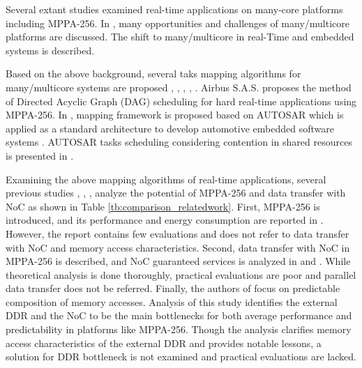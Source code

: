 \documentclass{sig-alternate-05-2015}
\begin{document}
Several extant studies examined real-time applications on many-core platforms including MPPA-256.
In \cite{saidi2015shift}, many opportunities and challenges of many/multicore platforms are discussed.
The shift to many/multicore in real-Time and embedded systems is described. 

Based on the above background, several taks mapping algorithms for many/multicore systems are proposed \cite{perret2016mapping}, \cite{puffitsch2015off}, \cite{carle2014static}, \cite{becker2014mapping}, \cite{faragardi2014communication}.
Airbus S.A.S. \cite{perret2016mapping} proposes the method of Directed Acyclic Graph (DAG) scheduling for hard real-time applications using MPPA-256.
In \cite{faragardi2014communication}, mapping framework is proposed based on AUTOSAR which is applied as a standard architecture to develop automotive embedded software systems \cite{furst2009autosar}.
AUTOSAR tasks scheduling considering contention in shared resources is presented in \cite{becker2016contention}.

Examining the above mapping algorithms of real-time applications, several previous studies \cite{kanter2015kalray}, \cite{denet2017work}, \cite{deDinechin2014GSN}, \cite{perret2016predictable} analyze the potential of MPPA-256 and data transfer with NoC as shown in Table \ref{tb:comparison_relatedwork}.
First, MPPA-256 is introduced, and its performance and energy consumption are reported in \cite{kanter2015kalray}.
However, the report contains few evaluations and does not refer to data transfer with NoC and memory access characteristics.
Second, data transfer with NoC in MPPA-256 is described, and NoC guaranteed services is analyzed in \cite{denet2017work} and \cite{deDinechin2014GSN}.
While theoretical analysis is done thoroughly, practical evaluations are poor and parallel data transfer does not be referred.
Finally, the authors of \cite{perret2016predictable} focus on predictable composition of memory accesses.
Analysis of this study identifies the external DDR and the NoC to be the main bottlenecks for both average performance and predictability in platforms like MPPA-256.
Though the analysis clarifies memory access characteristics of the external DDR and provides notable lessons, a solution for DDR bottleneck is not examined and practical evaluations are lacked.
\end{document}
